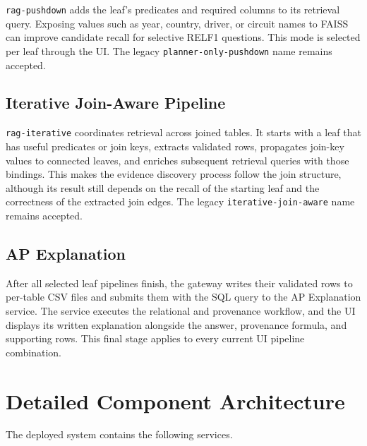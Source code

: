 \documentclass[11pt,a4paper]{article}
\newcommand{\code}[1]{\texttt{#1}}
\begin{document}
\code{rag-pushdown} adds the leaf's predicates and required columns to
its retrieval query. Exposing values such as year, country, driver, or circuit
names to FAISS can improve candidate recall for selective RELF1 questions. This
mode is selected per leaf through the UI. The legacy
\code{planner-only-pushdown} name remains accepted.

\subsection{Iterative Join-Aware Pipeline}

\code{rag-iterative} coordinates retrieval across joined tables. It
starts with a leaf that has useful predicates or join keys, extracts validated
rows, propagates join-key values to connected leaves, and enriches subsequent
retrieval queries with those bindings. This makes the evidence discovery process
follow the join structure, although its result still depends on the recall of
the starting leaf and the correctness of the extracted join edges. The legacy
\code{iterative-join-aware} name remains accepted.

\subsection{AP Explanation }

After all selected leaf pipelines finish, the gateway writes their validated
rows to per-table CSV files and submits them with the SQL query to the AP
Explanation service. The service executes the relational and provenance
workflow, and the UI displays its written explanation alongside the answer,
provenance formula, and supporting rows. This final stage applies to every
current UI pipeline combination.

\appendix

\section{Detailed Component Architecture}

The deployed system contains the following services.
\end{document}
